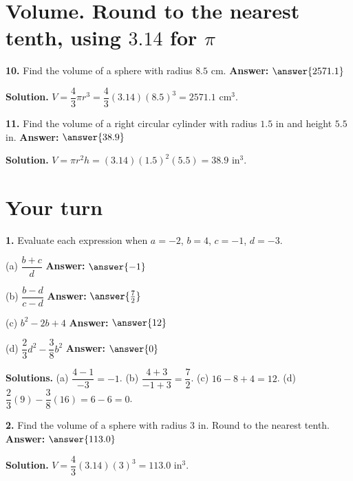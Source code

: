 \documentclass{ximera}
\begin{document}
\section*{Volume. Round to the nearest tenth, using $3.14$ for $\pi$}

\begin{problem}
\textbf{10.} Find the volume of a sphere with radius $8.5$ cm.
\qquad \textbf{Answer:} $\answer{2571.1}$

\begin{hint}
\textbf{Solution.} $V=\dfrac{4}{3}\pi r^{3}=\dfrac{4}{3}(3.14)(8.5)^{3}=2571.1$ cm$^{3}$.
\end{hint}
\end{problem}

\begin{problem}
\textbf{11.} Find the volume of a right circular cylinder with radius $1.5$ in and height
$5.5$ in. \qquad \textbf{Answer:} $\answer{38.9}$

\begin{hint}
\textbf{Solution.} $V=\pi r^{2}h=(3.14)(1.5)^{2}(5.5)=38.9$ in$^{3}$.
\end{hint}
\end{problem}

\section*{Your turn}

\begin{problem}
\textbf{1.} Evaluate each expression when $a=-2$, $b=4$, $c=-1$, $d=-3$.

(a) $\dfrac{b+c}{d}$ \qquad \textbf{Answer:} $\answer{-1}$

(b) $\dfrac{b-d}{c-d}$ \qquad \textbf{Answer:} $\answer{\frac{7}{2}}$

(c) $b^{2}-2b+4$ \qquad \textbf{Answer:} $\answer{12}$

(d) $\dfrac{2}{3}d^{2}-\dfrac{3}{8}b^{2}$ \qquad \textbf{Answer:} $\answer{0}$

\begin{hint}
\textbf{Solutions.} (a) $\dfrac{4-1}{-3}=-1$. \quad
(b) $\dfrac{4+3}{-1+3}=\dfrac{7}{2}$. \quad
(c) $16-8+4=12$. \quad
(d) $\dfrac{2}{3}(9)-\dfrac{3}{8}(16)=6-6=0$.
\end{hint}
\end{problem}

\begin{problem}
\textbf{2.} Find the volume of a sphere with radius $3$ in. Round to the nearest tenth.
\qquad \textbf{Answer:} $\answer{113.0}$

\begin{hint}
\textbf{Solution.} $V=\dfrac{4}{3}(3.14)(3)^{3}=113.0$ in$^{3}$.
\end{hint}
\end{problem}
\end{document}

